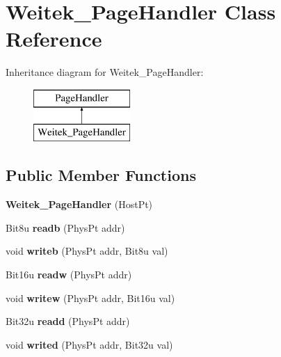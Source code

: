 \hypertarget{classWeitek__PageHandler}{\section{Weitek\-\_\-\-Page\-Handler Class Reference}
\label{classWeitek__PageHandler}
}
Inheritance diagram for Weitek\-\_\-\-Page\-Handler\-:\begin{figure}[H]
\begin{center}
\leavevmode
\includegraphics[height=2.000000cm]{classWeitek__PageHandler}
\end{center}
\end{figure}
\subsection*{Public Member Functions}
\begin{DoxyCompactItemize}
\item 
\hypertarget{classWeitek__PageHandler_a6f9d1ac5f330e31e71912b235a62ae4d}{{\bfseries Weitek\-\_\-\-Page\-Handler} (Host\-Pt)}\label{classWeitek__PageHandler_a6f9d1ac5f330e31e71912b235a62ae4d}

\item 
\hypertarget{classWeitek__PageHandler_a0b8172e6167576bccbf9c2ddc999ff27}{Bit8u {\bfseries readb} (Phys\-Pt addr)}\label{classWeitek__PageHandler_a0b8172e6167576bccbf9c2ddc999ff27}

\item 
\hypertarget{classWeitek__PageHandler_a33c5fead8058df5480b994fdb841c78f}{void {\bfseries writeb} (Phys\-Pt addr, Bit8u val)}\label{classWeitek__PageHandler_a33c5fead8058df5480b994fdb841c78f}

\item 
\hypertarget{classWeitek__PageHandler_a8c7afb012589d6eaf848cfcba8c45a07}{Bit16u {\bfseries readw} (Phys\-Pt addr)}\label{classWeitek__PageHandler_a8c7afb012589d6eaf848cfcba8c45a07}

\item 
\hypertarget{classWeitek__PageHandler_a06008146ee562fbb623963a2a6da41d3}{void {\bfseries writew} (Phys\-Pt addr, Bit16u val)}\label{classWeitek__PageHandler_a06008146ee562fbb623963a2a6da41d3}

\item 
\hypertarget{classWeitek__PageHandler_ad23036494fa8601ce14e62cd013b9bf8}{Bit32u {\bfseries readd} (Phys\-Pt addr)}\label{classWeitek__PageHandler_ad23036494fa8601ce14e62cd013b9bf8}

\item 
\hypertarget{classWeitek__PageHandler_a989c7d70a3d952375ea0668677a83830}{void {\bfseries writed} (Phys\-Pt addr, Bit32u val)}\label{classWeitek__PageHandler_a989c7d70a3d952375ea0668677a83830}

\end{DoxyCompactItemize}


